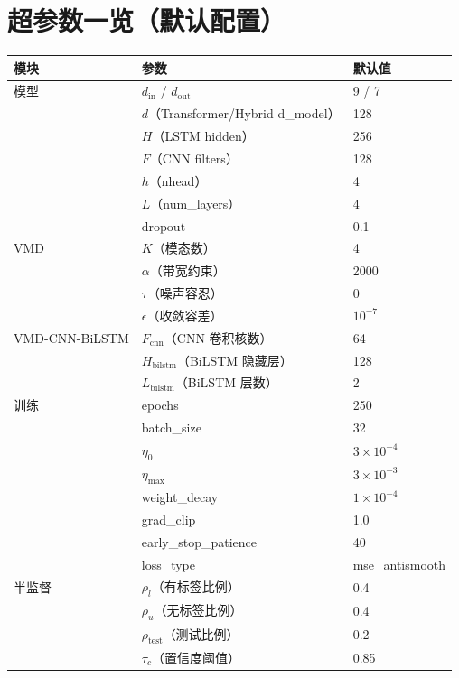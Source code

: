 \documentclass[11pt,a4paper]{article}
\begin{document}
\section{超参数一览（默认配置）}
\begin{table}[ht]
\centering
\begin{tabular}{@{}lll@{}}
\toprule
模块 & 参数 & 默认值 \\ \midrule
模型 & $d_{\text{in}}$ / $d_{\text{out}}$ & 9 / 7 \\
     & $d$（Transformer/Hybrid d\_model） & 128 \\
     & $H$（LSTM hidden） & 256 \\
     & $F$（CNN filters） & 128 \\
     & $h$（nhead） & 4 \\
     & $L$（num\_layers） & 4 \\
     & $\mathrm{dropout}$ & 0.1 \\ \midrule
VMD & $K$（模态数） & 4 \\
    & $\alpha$（带宽约束） & 2000 \\
    & $\tau$（噪声容忍） & 0 \\
    & $\epsilon$（收敛容差） & $10^{-7}$ \\ \midrule
VMD-CNN-BiLSTM & $F_{\text{cnn}}$（CNN 卷积核数） & 64 \\
               & $H_{\text{bilstm}}$（BiLSTM 隐藏层） & 128 \\
               & $L_{\text{bilstm}}$（BiLSTM 层数） & 2 \\ \midrule
训练 & epochs & 250 \\
     & batch\_size & 32 \\
     & $\eta_0$ & $3\times 10^{-4}$ \\
     & $\eta_{\max}$ & $3\times 10^{-3}$ \\
     & weight\_decay & $1\times 10^{-4}$ \\
     & grad\_clip & 1.0 \\
     & early\_stop\_patience & 40 \\
     & loss\_type & mse\_antismooth \\ \midrule
半监督 & $\rho_l$（有标签比例） & 0.4 \\
       & $\rho_u$（无标签比例） & 0.4 \\
       & $\rho_{\text{test}}$（测试比例） & 0.2 \\
       & $\tau_c$（置信度阈值） & 0.85 \\

\end{tabular}
\end{table}
\end{document}
